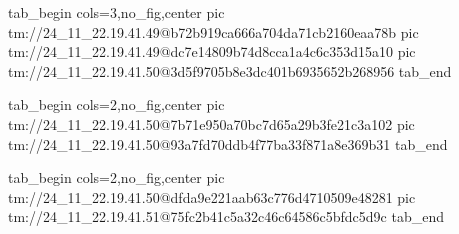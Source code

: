 \ifcmt
  tab_begin cols=3,no_fig,center
    pic tm://24_11_22.19.41.49@b72b919ca666a704da71cb2160eaa78b
    pic tm://24_11_22.19.41.49@dc7e14809b74d8cca1a4c6c353d15a10
    pic tm://24_11_22.19.41.50@3d5f9705b8e3dc401b6935652b268956
  tab_end
\fi


\ifcmt
  tab_begin cols=2,no_fig,center
    pic tm://24_11_22.19.41.50@7b71e950a70bc7d65a29b3fe21c3a102
    pic tm://24_11_22.19.41.50@93a7fd70ddb4f77ba33f871a8e369b31
  tab_end
\fi


\ifcmt
  tab_begin cols=2,no_fig,center
    pic tm://24_11_22.19.41.50@dfda9e221aab63c776d4710509e48281
    pic tm://24_11_22.19.41.51@75fc2b41c5a32c46c64586c5bfdc5d9c
  tab_end
\fi

